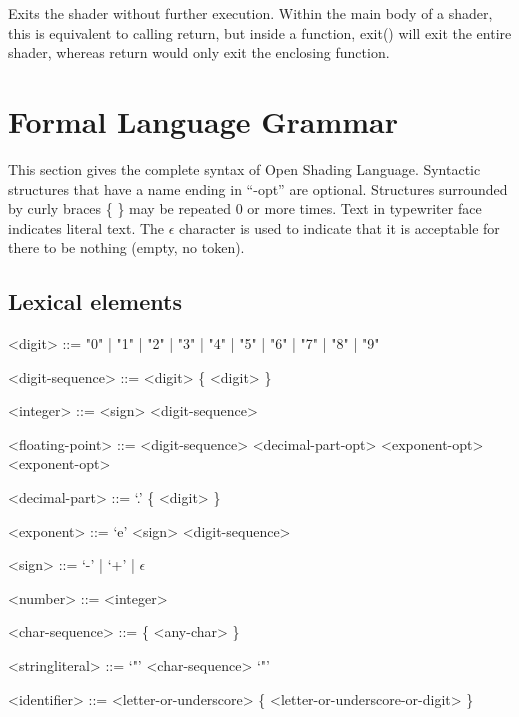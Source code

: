 \documentclass[11pt,letterpaper]{book}
\def\langname{Open Shading Language\xspace}
\begin{document}
Exits the shader without further execution.  Within the main body of a
shader, this is equivalent to calling {\cf return}, but inside a
function, {\cf exit()} will exit the entire shader, whereas {\cf return}
would only exit the enclosing function.
\apiend





\chapter{Formal Language Grammar}
\label{chap:grammar}

This section gives the complete syntax of \langname.  Syntactic
structures that have a name ending in ``-opt'' are optional.  Structures
surrounded by curly braces \{ \} may be repeated 0 or more times.  Text
in {\cf typewriter} face indicates literal text.  The $\epsilon$
character is used to indicate that it is acceptable for there to be
nothing (empty, no token).

\setlength{\grammarindent}{2cm}

\section*{Lexical elements}

\begin{grammar}

<digit> ::= "0" | "1" | "2" | "3" | "4" | "5" | "6" | "7" | "8" | "9"

<digit-sequence> ::= <digit> \{ <digit> \}

<integer> ::= <sign> <digit-sequence>

<floating-point> ::= <digit-sequence> <decimal-part-opt> <exponent-opt>
 <exponent-opt>

<decimal-part> ::= `.' \{ <digit> \}

<exponent> ::= `e' <sign> <digit-sequence>

<sign> ::= `-' | `+' | $\epsilon$

<number> ::= <integer>

<char-sequence> ::= \{ <any-char> \} 

<stringliteral> ::= `"' <char-sequence> `"'

<identifier> ::= <letter-or-underscore> \{ <letter-or-underscore-or-digit> \}

\end{grammar}
\end{document}

